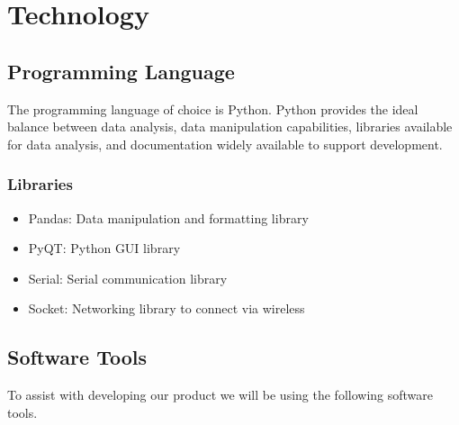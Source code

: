 \documentclass[12pt]{article}
\begin{document}
\section{Technology}

\subsection{Programming Language}

The programming language of choice is Python. Python provides the ideal balance between data analysis, data manipulation capabilities, libraries available for data analysis, and documentation widely available to support development.  

\subsubsection{Libraries}
\begin{itemize}
	\item Pandas: Data manipulation and formatting library
	\item PyQT: Python GUI library
	\item Serial: Serial communication library
	\item Socket: Networking library to connect via wireless
\end{itemize}

\newpage
\subsection{Software Tools}
To assist with developing our product we will be using the following software tools.
\end{document}
